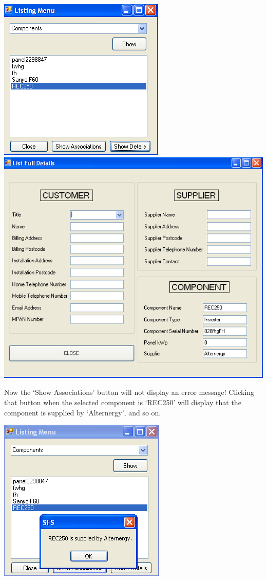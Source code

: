 		\includegraphics[scale=0.5]{component-frmList-lfd_scrot}
		\includegraphics[scale=0.25]{component-frmListFullDetails_scrot}
		
		Now the `Show Associations' button will not display an error message!  Clicking that button when the selected component is `REC250' will display that the component is supplied by `Alternergy', and so on.
		
		\includegraphics[scale=0.5]{component-frmList-sa_scrot}
		

